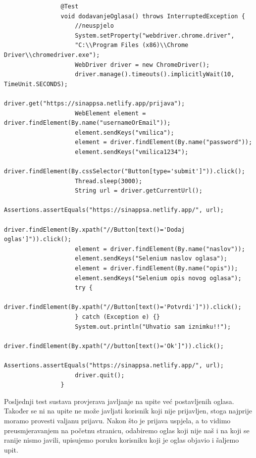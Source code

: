 			\begin{verbatim}
			    @Test
			    void dodavanjeOglasa() throws InterruptedException {
			        //neuspjelo
			        System.setProperty("webdriver.chrome.driver", 
			        "C:\\Program Files (x86)\\Chrome Driver\\chromedriver.exe");
			        WebDriver driver = new ChromeDriver();
			        driver.manage().timeouts().implicitlyWait(10, TimeUnit.SECONDS);
			        driver.get("https://sinappsa.netlify.app/prijava");
			        WebElement element = driver.findElement(By.name("usernameOrEmail"));
			        element.sendKeys("vmilica");
			        element = driver.findElement(By.name("password"));
			        element.sendKeys("vmilica1234");
			        driver.findElement(By.cssSelector("Button[type='submit']")).click();
			        Thread.sleep(3000);
			        String url = driver.getCurrentUrl();
			        Assertions.assertEquals("https://sinappsa.netlify.app/", url);
			        driver.findElement(By.xpath("//Button[text()='Dodaj oglas']")).click();
			        element = driver.findElement(By.name("naslov"));
			        element.sendKeys("Selenium naslov oglasa");
			        element = driver.findElement(By.name("opis"));
			        element.sendKeys("Selenium opis novog oglasa");
			        try {
			            driver.findElement(By.xpath("//Button[text()='Potvrdi']")).click();
			        } catch (Exception e) {}
			        System.out.println("Uhvatio sam iznimku!!");
			        driver.findElement(By.xpath("//button[text()='Ok']")).click();
			        Assertions.assertEquals("https://sinappsa.netlify.app/", url);
			        driver.quit();
			    }
			\end{verbatim}
			Posljednji test sustava provjerava javljanje na upite već postavljenih oglasa. Također se ni na upite ne može javljati korisnik koji nije prijavljen, stoga najprije moramo provesti valjanu prijavu. Nakon što je prijava uspjela, a to vidimo preusmjeravanjem na početnu stranicu, odabiremo oglas koji nije naš i na koji se ranije nismo javili, upisujemo poruku korisniku koji je oglas objavio i šaljemo upit.
			
